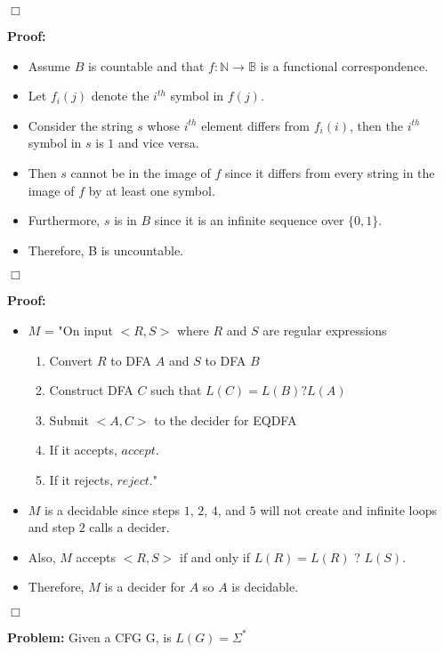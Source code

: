 \documentclass[11pt]{article}
\newcommand{\question}[2] {\vspace{.25in} \fbox{#1} #2 \vspace{.10in}}
\begin{document}
\indent $\Box$

\pagebreak
\question{3}{\textbf{Proof:}}

\begin{itemize}
\item Assume $B$ is countable and that $f\colon \mathbb{N} \to  \mathbb{B}$ is a functional correspondence. 
\item Let $f_{i}(j)$ denote the $i^{th}$ symbol in $f(j)$. 
\item Consider the string $s$ whose $i^{th}$ element differs from $f_{i}(i)$, then the  $i^{th}$ symbol in $s$ is $1$ and vice versa.
\item Then $s$ cannot be in the image of $f$ since it differs from every string in the image of $f$ by at least one symbol. 
\item Furthermore, $s$ is in $B$ since it is an infinite sequence over $\{0,1\}$.
\item Therefore, B is uncountable.
\end{itemize}

\indent $\Box$

\question{4}{\textbf{Proof:}}

\begin{itemize}
  \item $M$ = "On input $<R,S>$ where $R$ and $S$ are regular expressions 
 \begin{center}
   \begin{enumerate}
     \item Convert $R$ to DFA $A$ and $S$ to DFA $B$ 
     \item Construct DFA $C$ such that $L(C) = L(B) ? L(A)$ 
     \item Submit $<A,C>$ to the decider for EQDFA 
     \item If it accepts, $accept$.
     \item If it rejects, $reject$." 
   \end{enumerate}
 \end{center}
     
  \item $M$ is a decidable since steps $1$, $2$, $4$, and $5$ will not create and infinite loops and step $2$ calls a decider. 
  \item Also, $M$ accepts $<R,S>$ if and only if $L(R) = L(R)$ ? $L(S).$ 
  \item Therefore, $M$ is a decider for $A$ so $A$ is decidable. 
\end{itemize}
\indent $\Box$

\question{5}{\textbf{Problem:} Given a CFG G, is $L(G) = \Sigma^{*}$}
\end{document}

